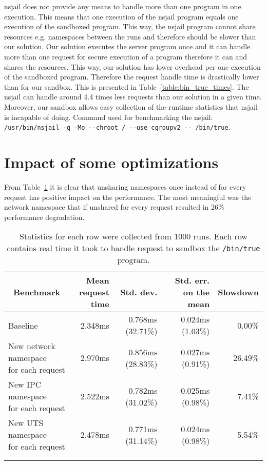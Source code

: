 \documentclass[en]{pracamgr}
\begin{document}
nsjail does not provide any means to handle more than one program in one execution. This means that one execution of the nsjail program equals one execution of the sandboxed program. This way, the nsjail program cannot share resources e.g. namespaces between the runs and therefore should be slower than our solution. Our solution executes the server program once and it can handle more than one request for secure execution of a program therefore it can and shares the resources. This way, our solution has lower overhead per one execution of the sandboxed program.
Therefore the request handle time is drastically lower than for our sandbox. This is presented in Table~\ref{table:bin_true_times}. The nsjail can handle around 4.4 times less requests than our solution in a given time. Moreover, our sandbox allows easy collection of the runtime statistics that nsjail is incapable of doing. Command used for benchmarking the nsjail: \texttt{/usr/bin/nsjail -q -Mo -{}-chroot / -{}-use\_cgroupv2 -{}- /bin/true}.

\section{Impact of some optimizations}

From Table~\ref{table:optimization_impact} it is clear that unsharing namespaces once instead of for every request has positive impact on the performance. The most meaningful was the network namespace that if unshared for every request resulted in 26\% performance degradation.

\begin{small}
\begin{longtable}{|l|r|r|r|r|}
\hline
\multicolumn{1}{|c|}{Benchmark} & \makecell{Mean\\request time} & Std. dev. & Std. err. on the mean & \multicolumn{1}{c|}{Slowdown} \\
\hline
Baseline                                              & 2.348ms & 0.768ms (32.71\%) & 0.024ms (1.03\%) & 0.00\% \\
\hline
\makecell{New network namespace \\ for each request}  & 2.970ms & 0.856ms (28.83\%) & 0.027ms (0.91\%) & 26.49\% \\
\hline
\makecell{New IPC namespace \\ for each request}      & 2.522ms & 0.782ms (31.02\%) & 0.025ms (0.98\%) & 7.41\% \\
\hline
\makecell{New UTS namespace \\ for each request}      & 2.478ms & 0.771ms (31.14\%) & 0.024ms (0.98\%) & 5.54\% \\
\hline
\multicolumn{1}{c}{}\\ %
\caption{Statistics for each row were collected from 1000 runs. Each row contains real time it took to handle request to sandbox the \texttt{/bin/true} program.}
\label{table:optimization_impact}
\end{longtable}
\end{small}
\end{document}
